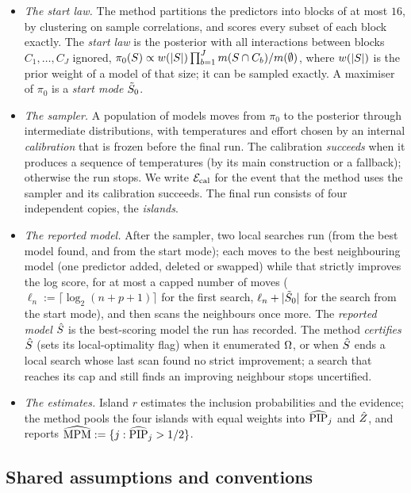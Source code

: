 \begin{itemize}[leftmargin=1.5em,itemsep=1pt]
  \item \emph{The start law.} The method partitions the predictors into blocks of at most $16$, by clustering on sample
    correlations, and scores every subset of each block exactly. The \emph{start law} is the posterior with all
    interactions between blocks $C_1,\dots,C_J$ ignored,
    $\pi_0(S)\propto w(\lvert S\rvert)\prod_{b=1}^{J}m(S\cap C_b)/m(\emptyset)$, where $w(\lvert S\rvert)$ is the prior weight of a
    model of that size; it can be sampled exactly. A maximiser of $\pi_0$ is a \emph{start mode} $\tilde S_0$.
  \item \emph{The sampler.} A population of models moves from $\pi_0$ to the posterior through intermediate
    distributions, with temperatures and effort chosen by an internal \emph{calibration} that is frozen before the final
    run. The calibration \emph{succeeds} when it produces a sequence of temperatures (by its main construction or a
    fallback); otherwise the run stops. We write $\mathcal E_{\mathrm{cal}}$ for the event that the method uses the sampler and its
    calibration succeeds. The final run consists of four independent copies, the \emph{islands}.
  \item \emph{The reported model.} After the sampler, two local searches run (from the best model found, and from the
    start mode); each moves to the best neighbouring model (one predictor added, deleted or swapped) while that strictly
    improves the log score, for at most a capped number of moves ($\ell_n:=\lceil\log_2(n+p+1)\rceil$ for the first search,
    $\ell_n+\lvert \tilde S_0\rvert$ for the search from the start mode), and then scans the neighbours once more.
    The \emph{reported model} $\hat S$ is the best-scoring model the run has recorded. The method \emph{certifies}
    $\hat S$ (sets its local-optimality flag) when it enumerated $\Omega$, or when $\hat S$ ends a local search whose last scan
    found no strict improvement; a search that reaches its cap and still finds an improving neighbour stops uncertified.
  \item \emph{The estimates.} Island $r$ estimates the inclusion probabilities and the evidence; the method pools the
    four islands with equal weights into $\widehat{\mathrm{PIP}}_j$ and $\hat Z$, and reports $\widehat{\mathrm{MPM}}:=\{j:\widehat{\mathrm{PIP}}_j>1/2\}$.
\end{itemize}

\subsection{Shared assumptions and conventions}\label{sec:standing}

